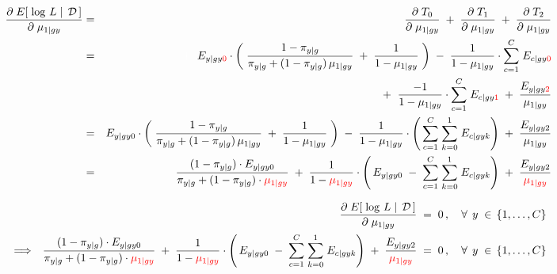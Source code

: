 \begin{eqnarray*}
\dfrac{\partial\;E\!\left[\,\left.\log\,L\;\right\vert\;\mathcal{D}\,\right]}{\partial\;\mu_{1 \vert gy}}
&=&
	\dfrac{\partial\;T_{0}}{\partial\;\mu_{1 \vert gy}}
	\;+\;
	\dfrac{\partial\;T_{1}}{\partial\;\mu_{1 \vert gy}}
	\;+\;
	\dfrac{\partial\;T_{2}}{\partial\;\mu_{1 \vert gy}}
\\
&=&
	{\color{white}+} \;\;
	E_{y \vert gy{\color{red}0}} \cdot
	\left(\;
		\dfrac{1-\pi_{y \vert g}}{\pi_{y \vert g} + (1-\pi_{y \vert g})\,\mu_{1\vert gy} }
		\; + \;
		\dfrac{1}{1 - \mu_{1\vert gy}}
	\;\right)
	\; - \; \dfrac{1}{1 - \mu_{1\vert gy}} \cdot \overset{C}{\underset{c=1}{\sum}}\; E_{c \vert gy{\color{red}0}}
\\
&&
	+ \;\;
	\dfrac{-1}{1-\mu_{1\vert gy}} \cdot \overset{C}{\underset{c=1}{\sum}}\; E_{c \vert gy{\color{red}1}}
	\; + \;
	\dfrac{E_{y \vert gy{\color{red}2}}}{\mu_{1 \vert gy}}
\\
&=&
	E_{y \vert gy0} \cdot
	\left(\;
		\dfrac{1-\pi_{y \vert g}}{\pi_{y \vert g} + (1-\pi_{y \vert g})\,\mu_{1\vert gy} }
		\; + \;
		\dfrac{1}{1 - \mu_{1\vert gy}}
	\;\right)
	\; - \;
	\dfrac{1}{1-\mu_{1\vert gy}}
	\cdot
	\left(\,
		\overset{C}{\underset{c=1}{\sum}}\;
		\overset{1}{\underset{k=0}{\sum}}\;
		E_{c \vert gyk}
	\right)
	\; + \;
	\dfrac{E_{y \vert gy2}}{\mu_{1 \vert gy}}
\\
&=&
	\dfrac{(1-\pi_{y \vert g}) \cdot E_{y \vert gy0}}{\pi_{y \vert g} + (1-\pi_{y \vert g})\cdot{\color{red}\mu_{1\vert gy}}}
	\; + \;
	\dfrac{1}{1-{\color{red}\mu_{1\vert gy}}}
	\cdot
	\left(\,
		E_{y \vert gy0}
		\;-\;
		\overset{C}{\underset{c=1}{\sum}}\;
		\overset{1}{\underset{k=0}{\sum}}\;
		E_{c \vert gyk}
	\right)
	\; + \;
	\dfrac{E_{y \vert gy2}}{\color{red}\mu_{1 \vert gy}}
\end{eqnarray*}

\begin{eqnarray*}
&&
	\dfrac{\partial\;E\!\left[\,\left.\log\,L\;\right\vert\;\mathcal{D}\,\right]}{\partial\;\mu_{1 \vert gy}} \;=\; 0\,,
	\quad\forall\;\,y\;\in\,\{1,\ldots,C\}
\\
&\Longrightarrow&
	\dfrac{(1-\pi_{y \vert g}) \cdot E_{y \vert gy0}}{\pi_{y \vert g} + (1-\pi_{y \vert g})\cdot{\color{red}\mu_{1\vert gy}}}
	\; + \;
	\dfrac{1}{1-{\color{red}\mu_{1\vert gy}}}
	\cdot
	\left(\,
		E_{y \vert gy0}
		\;-\;
		\overset{C}{\underset{c=1}{\sum}}\;
		\overset{1}{\underset{k=0}{\sum}}\;
		E_{c \vert gyk}
	\right)
	\; + \;
	\dfrac{E_{y \vert gy2}}{\color{red}\mu_{1 \vert gy}}
	\; = \; 0 \,,
	\quad\forall\;\,y\;\in\,\{1,\ldots,C\}	
\end{eqnarray*}

